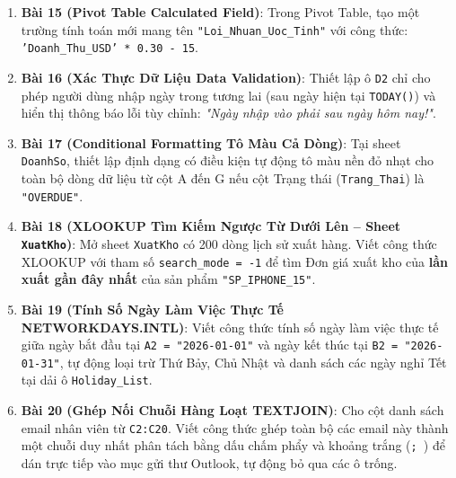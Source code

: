 \begin{baitapbox}
\begin{enumerate}
    \item \textbf{Bài 15 (Pivot Table Calculated Field)}: Trong Pivot Table, tạo một trường tính toán mới mang tên \texttt{"Loi\_Nhuan\_Uoc\_Tinh"} với công thức: \texttt{'Doanh\_Thu\_USD' * 0.30 - 15}.
    \item \textbf{Bài 16 (Xác Thực Dữ Liệu Data Validation)}: Thiết lập ô \texttt{D2} chỉ cho phép người dùng nhập ngày trong tương lai (sau ngày hiện tại \texttt{TODAY()}) và hiển thị thông báo lỗi tùy chỉnh: \textit{"Ngày nhập vào phải sau ngày hôm nay!"}.
    \item \textbf{Bài 17 (Conditional Formatting Tô Màu Cả Dòng)}: Tại sheet \texttt{DoanhSo}, thiết lập định dạng có điều kiện tự động tô màu nền đỏ nhạt cho toàn bộ dòng dữ liệu từ cột A đến G nếu cột Trạng thái (\texttt{Trang\_Thai}) là \texttt{"OVERDUE"}.
    \item \textbf{Bài 18 (XLOOKUP Tìm Kiếm Ngược Từ Dưới Lên -- Sheet \texttt{XuatKho})}: Mở sheet \texttt{XuatKho} có 200 dòng lịch sử xuất hàng. Viết công thức XLOOKUP với tham số \texttt{search\_mode = -1} để tìm Đơn giá xuất kho của \textbf{lần xuất gần đây nhất} của sản phẩm \texttt{"SP\_IPHONE\_15"}.
    \item \textbf{Bài 19 (Tính Số Ngày Làm Việc Thực Tế NETWORKDAYS.INTL)}: Viết công thức tính số ngày làm việc thực tế giữa ngày bắt đầu tại \texttt{A2 = "2026-01-01"} và ngày kết thúc tại \texttt{B2 = "2026-01-31"}, tự động loại trừ Thứ Bảy, Chủ Nhật và danh sách các ngày nghỉ Tết tại dải ô \texttt{Holiday\_List}.
    \item \textbf{Bài 20 (Ghép Nối Chuỗi Hàng Loạt TEXTJOIN)}: Cho cột danh sách email nhân viên từ \texttt{C2:C20}. Viết công thức ghép toàn bộ các email này thành một chuỗi duy nhất phân tách bằng dấu chấm phẩy và khoảng trắng (\texttt{; }) để dán trực tiếp vào mục gửi thư Outlook, tự động bỏ qua các ô trống.
\end{enumerate}
\end{baitapbox}

